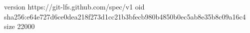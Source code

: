 version https://git-lfs.github.com/spec/v1
oid sha256:e64e727d6ce0dea218f273d1cc21b3bfecb980b4850b0ec5ab8e35b8c09a16c4
size 22000
